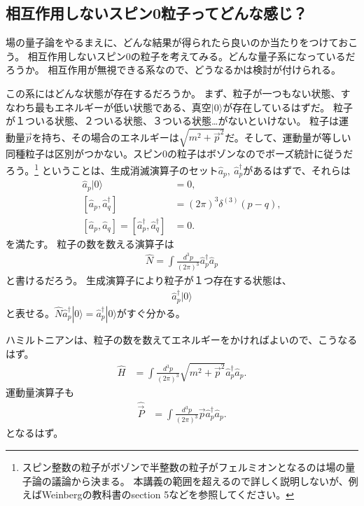 \documentclass[10pt,a4paper]{jarticle}
\begin{document}
\subsection{相互作用しないスピン0粒子ってどんな感じ？}\label{sec:how spin 0 theory looks}
場の量子論をやるまえに、どんな結果が得られたら良いのか当たりをつけておこう。
相互作用しないスピン0の粒子を考えてみる。どんな量子系になっているだろうか。
相互作用が無視できる系なので、どうなるかは検討が付けられる。

この系にはどんな状態が存在するだろうか。
まず、粒子が一つもない状態、すなわち最もエネルギーが低い状態である、真空$|0\rangle$が存在しているはずだ。
粒子が１ついる状態、２ついる状態、３ついる状態\dots がないといけない。
粒子は運動量$\vec p$を持ち、その場合のエネルギーは$\sqrt{m^2 + \vec p^2}$だ。そして、運動量が等しい同種粒子は区別がつかない。スピン0の粒子はボゾンなのでボーズ統計に従うだろう。\footnote{
スピン整数の粒子がボゾンで半整数の粒子がフェルミオンとなるのは場の量子論の議論から決まる。
本講義の範囲を超えるので詳しく説明しないが、例えばWeinbergの教科書のsection 5などを参照してください。
}
ということは、生成消滅演算子のセット$\hat a_p,~\hat a_p^\dagger$があるはずで、それらは
\begin{align}
\hat a_p |0\rangle &= 0, \\
[\hat a_p, \hat a_q^\dagger] &= (2\pi)^3 \delta^{(3)}(p-q), \\
[\hat a_p, \hat a_q] = [\hat a_p^\dagger, \hat a_q^\dagger] &= 0.
\end{align}
を満たす。
粒子の数を数える演算子は
\begin{align}
\hat N = \int \frac{d^3 p}{(2\pi)^3} \hat a_p^\dagger \hat a_p
\end{align}
と書けるだろう。
%
生成演算子により粒子が１つ存在する状態は、
\begin{align}
\hat a_p^\dagger |0\rangle
\end{align}
と表せる。$\hat N \hat a_p^\dagger |0\rangle = \hat a_p^\dagger |0\rangle$がすぐ分かる。


ハミルトニアンは、粒子の数を数えてエネルギーをかければよいので、こうなるはず。
\begin{align}
\hat H &= \int \frac{d^3 p}{(2\pi)^3} \sqrt{m^2 + \vec p^2} \hat a_p^\dagger \hat a_p. \label{eq:hamiltonian spin 0}
\end{align}
運動量演算子も
\begin{align}
\hat {\vec P} &= \int \frac{d^3 p}{(2\pi)^3} \vec p \hat a_p^\dagger \hat a_p. \label{eq:momentum spin 0}
\end{align}
となるはず。
\end{document}
